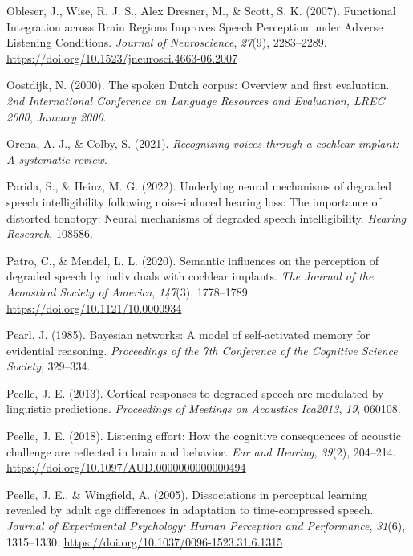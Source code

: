 \documentclass[a4paper, nobind]{templates/ociamthesis}
\newlength{\cslhangindent}
\newenvironment{CSLReferences}[2] %
 {%
  \setlength{\parindent}{0pt}
  \ifodd #1
  \let\oldpar\par
  \def\par{\hangindent=\cslhangindent\oldpar}
  \fi
  \setlength{\parskip}{1mm}
  \setlength{\baselineskip}{6mm}
 }%
 {}
\begin{document}
\begin{CSLReferences}{1}{0}
\leavevmode{}%
Obleser, J., Wise, R. J. S., Alex Dresner, M., \& Scott, S. K. (2007). Functional Integration across Brain Regions Improves Speech Perception under Adverse Listening Conditions. \emph{Journal of Neuroscience}, \emph{27}(9), 2283--2289. \url{https://doi.org/10.1523/jneurosci.4663-06.2007}

\leavevmode{}%
Oostdijk, N. (2000). {The spoken Dutch corpus: Overview and first evaluation}. \emph{2nd International Conference on Language Resources and Evaluation, LREC 2000}, \emph{January 2000}.

\leavevmode{}%
Orena, A. J., \& Colby, S. (2021). \emph{Recognizing voices through a cochlear implant: A systematic review}.

\leavevmode{}%
Parida, S., \& Heinz, M. G. (2022). Underlying neural mechanisms of degraded speech intelligibility following noise-induced hearing loss: The importance of distorted tonotopy: Neural mechanisms of degraded speech intelligibility. \emph{Hearing Research}, 108586.

\leavevmode{}%
Patro, C., \& Mendel, L. L. (2020). Semantic influences on the perception of degraded speech by individuals with cochlear implants. \emph{The Journal of the Acoustical Society of America}, \emph{147}(3), 1778--1789. \url{https://doi.org/10.1121/10.0000934}

\leavevmode{}%
Pearl, J. (1985). {Bayesian networks: A model of self-activated memory for evidential reasoning}. \emph{Proceedings of the 7th Conference of the Cognitive Science Society}, 329--334.

\leavevmode{}%
Peelle, J. E. (2013). Cortical responses to degraded speech are modulated by linguistic predictions. \emph{Proceedings of Meetings on Acoustics Ica2013}, \emph{19}, 060108.

\leavevmode{}%
Peelle, J. E. (2018). {Listening effort: How the cognitive consequences of acoustic challenge are reflected in brain and behavior}. \emph{Ear and Hearing}, \emph{39}(2), 204--214. \url{https://doi.org/10.1097/AUD.0000000000000494}

\leavevmode{}%
Peelle, J. E., \& Wingfield, A. (2005). {Dissociations in perceptual learning revealed by adult age differences in adaptation to time-compressed speech}. \emph{Journal of Experimental Psychology: Human Perception and Performance}, \emph{31}(6), 1315--1330. \url{https://doi.org/10.1037/0096-1523.31.6.1315}


\end{CSLReferences}
\end{document}
